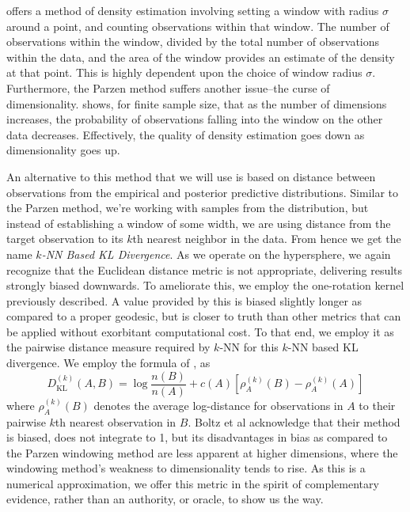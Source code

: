 \cite{parzen1962} offers a method of density estimation involving setting a window with
  radius $\sigma$ around a point, and counting observations within that window.  The number of
  observations within the window, divided by the total number of observations within the data,
  and the area of the window provides an estimate of the density at that point. This is highly
  dependent upon the choice of window radius $\sigma$.  Furthermore, the Parzen method suffers
  another issue--the curse of dimensionality.  \cite{boltz2009} shows, for finite sample size, that
  as the number of dimensions increases, the probability of observations falling into the window on
  the other data decreases. Effectively, the quality of density estimation goes down as
  dimensionality goes up.

An alternative to this method that we will use is based on distance between observations from the
  empirical and posterior predictive distributions.  Similar to the Parzen method, we're working
  with samples from the distribution, but instead of establishing a window of some width, we are
  using distance from the target observation to its $k$th nearest neighbor in the data.
  From hence we get the name \emph{$k$-NN Based KL Divergence}.  As we operate on the hypersphere,
  we again recognize that the Euclidean distance metric is not appropriate, delivering results strongly
  biased downwards.  To ameliorate this, we employ the one-rotation kernel previously described.  
  A value provided by this is biased slightly longer as compared to a proper geodesic, 
  but is closer to truth than other metrics that can be applied without exorbitant computational cost. 
  To that end, we employ it as the pairwise distance measure required by $k$-NN for this $k$-NN
  based KL divergence.  We employ the formula of \cite{boltz2009}, as
  \begin{equation}
    \label{eqn:knnkld}
    D_{\text{KL}}^{(k)}(A,B) = \log\frac{n(B)}{n(A)} + c(A) \left[\rho_A^{(k)}(B)
                                                                      - \rho_A^{(k)}(A)\right]
  \end{equation}
  where $\rho_A^{(k)}(B)$ denotes the average log-distance for observations in $A$ to their pairwise 
  $k$th nearest observation in $B$.  Boltz et al acknowledge that their method is biased, does not
  integrate to 1, but its disadvantages in bias as compared to the Parzen windowing method are less
  apparent at higher dimensions, where the windowing method's weakness to dimensionality tends to
  rise.  As this is a numerical approximation, we offer this metric in the spirit of
  complementary evidence, rather than an authority, or oracle, to show us the way.

